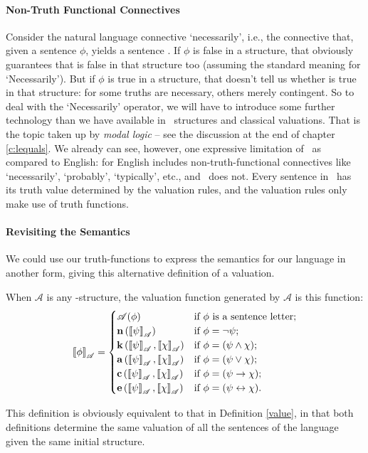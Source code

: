 \paragraph{Non-Truth Functional Connectives} Consider the natural language connective `necessarily', i.e., the connective that, given a sentence $\phi$, yields a sentence . If $\phi$ is false in a structure, that obviously guarantees that  is false in that structure too (assuming the standard meaning for ‘Necessarily’). But if $\phi$ is true in a structure, that doesn't tell us whether  is true in that structure: for some truths are necessary, others merely contingent. So to deal with the `Necessarily' operator, we will have to introduce some further technology than we have available in \lone\ structures and classical valuations. That is the topic taken up by \emph{modal logic} – see the discussion at the end of chapter \ref{c:lequals}. We already can see, however, one expressive limitation of \lone\ as compared to English: for English includes non-truth-functional connectives like `necessarily', `probably', `typically', etc., and \lone\ does not. Every sentence in \lone\ has its truth value determined by the valuation rules, and the valuation rules only make use of truth functions.

\paragraph{Revisiting the Semantics} We could use our truth-functions to express the semantics for our language in another form, giving this alternative definition of a valuation. \begin{definition}
	When $\mathscr{A}$ is any \lone-structure, the valuation function generated by $\mathscr{A}$ is this function\label{val2}: $$\left\llbracket \phi\right\rrbracket_{\mathscr{A}} = \begin{cases}
		\mathscr{A}(\phi) &\text{if $\phi$ is a sentence letter};\\
		\mathbf{n}\left(\left\llbracket \psi\right\rrbracket_{\mathscr{A}}\right) &\text{if } \phi = \neg\psi;\\
		\mathbf{k}\left(\left\llbracket \psi\right\rrbracket_{\mathscr{A}},\left\llbracket \chi\right\rrbracket_{\mathscr{A}}\right) &\text{if } \phi = (\psi \wedge \chi);\\ 
		\mathbf{a}\left(\left\llbracket \psi\right\rrbracket_{\mathscr{A}},\left\llbracket \chi\right\rrbracket_{\mathscr{A}}\right) &\text{if } \phi = (\psi \vee \chi);\\
		\mathbf{c}\left(\left\llbracket \psi\right\rrbracket_{\mathscr{A}},\left\llbracket \chi\right\rrbracket_{\mathscr{A}}\right) &\text{if } \phi = (\psi \to \chi);\\
		\mathbf{e}\left(\left\llbracket \psi\right\rrbracket_{\mathscr{A}},\left\llbracket \chi\right\rrbracket_{\mathscr{A}}\right) &\text{if } \phi = (\psi \leftrightarrow \chi).\\ 
	\end{cases}$$
\end{definition} This definition is obviously equivalent to that in Definition \ref{value}, in that both definitions determine the same valuation of all the sentences of the language given the same initial structure.





